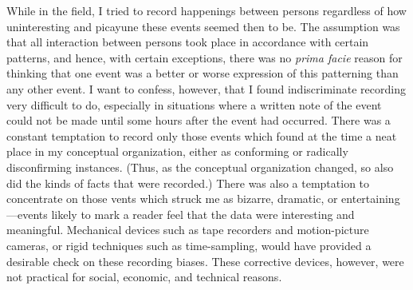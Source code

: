 \documentclass[openany,nobib]{tufte-book}
\begin{document}
While in the field, I tried to record happenings between persons
regardless of how uninteresting and picayune these events seemed then to
be. The assumption was that all interaction between persons took place
in accordance with certain patterns, and hence, with certain exceptions,
there was no \emph{prima facie} reason for thinking that one event was a
better or worse expression of this patterning than any other event. I
want to confess, however, that I found indiscriminate recording very
difficult to do, especially in situations where a written note of the
event could not be made until some hours after the event had occurred.
There was a constant temptation to record only those events which found
at the time a neat place in my conceptual organization, either as
conforming or radically disconfirming instances. (Thus, as the
conceptual organization changed, so also did the kinds of facts that
were recorded.) There was also a temptation to concentrate on those
vents which struck me as bizarre, dramatic, or entertaining---events
likely to mark a reader feel that the data were interesting and
meaningful. Mechanical devices such as tape recorders and motion-picture
cameras, or rigid techniques such as time-sampling, would have provided
a desirable check on these recording biases. These corrective devices,
however, were not practical for social, economic, and technical reasons.
\end{document}
